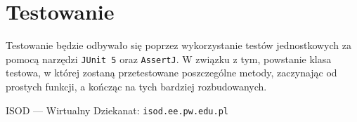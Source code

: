 \documentclass[12pt,a4paper]{article}
\begin{document}
\newpage
\section{Testowanie}
Testowanie będzie odbywało się poprzez wykorzystanie testów jednostkowych za pomocą narzędzi \texttt{JUnit 5} oraz \texttt{AssertJ}. W związku z tym, powstanie klasa testowa, w której zostaną przetestowane poszczególne metody, zaczynając od prostych funkcji, a kończąc na tych bardziej rozbudowanych.

\begin{thebibliography}{1}
ISOD — Wirtualny Dziekanat:
\texttt{isod.ee.pw.edu.pl}
\end{thebibliography}
\end{document}
